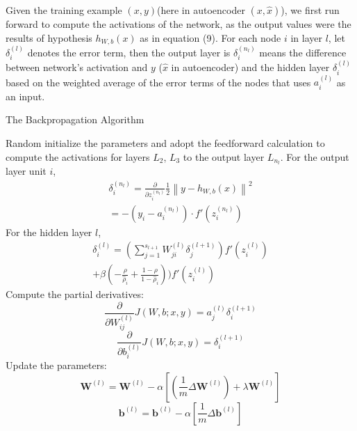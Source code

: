 \documentclass[journal]{IEEEtran}
\begin{document}
Given the training example $(x,y)$(here in autoencoder $(x, \hat{x})$), we first run forward to compute the activations of the network, as the output values were the results of hypothesis $h_{W, b}(x)$ as in equation (9). For each node $i$ in layer $l$, let $\delta_i^{(l)}$ denotes the error term, then the output layer is $\delta^{(n_l)}_i $ means the difference between network's activation and $y$ ($\hat{x}$ in autoencoder) and the hidden layer $\delta^{(l)}_i$ based on the weighted average of the error terms of the nodes that uses $a^{(l)}_i$ as an input.

\begin{algorithm}
\caption{The Backpropagation Algorithm}
\begin{algorithmic}[1]
\State Random initialize the parameters and adopt the feedforward calculation to compute the activations for layers $L_2$, $L_3$ to the output layer $L_{n_l}$.
\State For the output layer unit $i$,
\begin{equation}
\begin{split}
\delta^{(n_l)}_i = \frac{\partial}{\partial z^{(n_l)}_i}\frac{1}{2} \left\|y - h_{W,b}(x)\right\|^2 \\
= - (y_i - a^{(n_l)}_i) \cdot f'(z^{(n_l)}_i)
\end{split}
\end{equation} 
\State For the hidden layer $l$, 
\begin{equation}
\begin{split}
\delta^{(l)}_i = \left( \sum_{j=1}^{s_{l+1}} W^{(l)}_{ji} \delta^{(l+1)}_j \right) f'(z^{(l)}_i) \\
+ \beta( - \frac{\rho}{\hat\rho_i} + \frac{1-\rho}{1-\hat\rho_i} ) ) f'(z^{(l)}_i)           
\end{split}
\end{equation}
\State Compute the partial derivatives:
\begin{equation}
\frac{\partial}{\partial W_{ij}^{(l)}} J(W,b; x, y) = a^{(l)}_j \delta_i^{(l+1)} 
\end{equation}
\begin{equation}
\frac{\partial}{\partial b_{i}^{(l)}} J(W,b; x, y) = \delta_i^{(l+1)}
\end{equation}
\State Update the parameters:
\begin{equation}
\mathbf W^{(l)} = \mathbf W^{(l)} - \alpha [ (\frac{1}{m} \Delta \mathbf W^{(l)} ) + \lambda \mathbf W^{(l)}] 
\end{equation}
\begin{equation}
\mathbf b^{(l)} = \mathbf b^{(l)} - \alpha [\frac{1}{m} \Delta \mathbf b^{(l)}]
\end{equation}
\end{algorithmic}
\end{algorithm}
\end{document}
